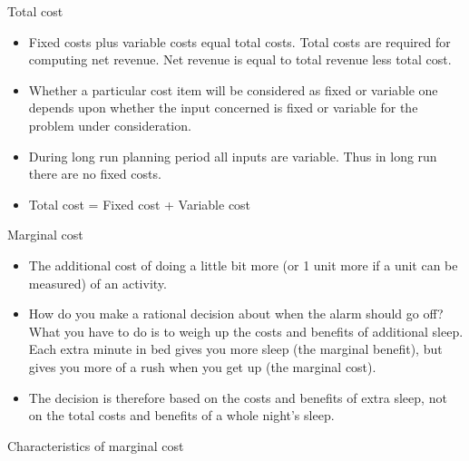 \documentclass[12pt,ignorenonframetext,aspectratio=169]{beamer}
\providecommand{\tightlist}{%
  \setlength{\itemsep}{0pt}\setlength{\parskip}{0pt}}
\begin{document}
\begin{frame}{Total cost}
\protect\hypertarget{total-cost}{}
\begin{itemize}
\tightlist
\item
  Fixed costs plus variable costs equal total costs. Total costs are
  required for computing net revenue. Net revenue is equal to total
  revenue less total cost.
\item
  Whether a particular cost item will be considered as fixed or variable
  one depends upon whether the input concerned is fixed or variable for
  the problem under consideration.
\item
  During long run planning period all inputs are variable. Thus in long
  run there are no fixed costs.
\item
  Total cost = Fixed cost + Variable cost
\end{itemize}
\end{frame}

\begin{frame}{Marginal cost}
\protect\hypertarget{marginal-cost}{}
\begin{itemize}
\tightlist
\item
  The additional cost of doing a little bit more (or 1 unit more if a
  unit can be measured) of an activity.
\item
  How do you make a rational decision about when the alarm should go
  off? What you have to do is to weigh up the costs and benefits of
  additional sleep. Each extra minute in bed gives you more sleep (the
  marginal benefit), but gives you more of a rush when you get up (the
  marginal cost).
\item
  The decision is therefore based on the costs and benefits of extra
  sleep, not on the total costs and benefits of a whole night's sleep.
\end{itemize}
\end{frame}

\begin{frame}{Characteristics of marginal cost}
\protect\hypertarget{characteristics-of-marginal-cost}{}
\end{frame}
\end{document}

